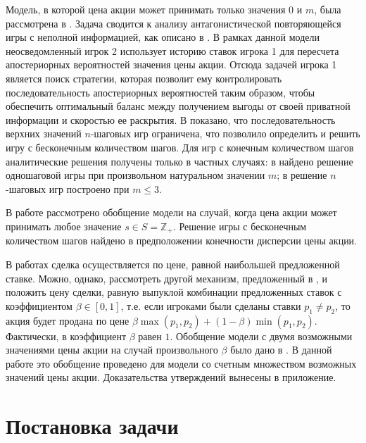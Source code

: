 \documentclass[12pt, draft]{extarticle}
\newcommand{\s}{\ensuremath{s}}
\begin{document}
Модель, в которой цена акции может принимать только значения $0$ и $m$, была
рассмотрена в \cite{bib:domansky07}. Задача сводится к анализу антагонистической
повторяющейся игры с неполной информацией, как описано в \cite{bib:aumann}. В
рамках данной модели неосведомленный игрок 2 использует историю ставок игрока 1
для пересчета апостериорных вероятностей значения цены акции. Отсюда задачей
игрока 1 является поиск стратегии, которая позволит ему контролировать
последовательность апостериорных вероятностей таким образом, чтобы обеспечить
оптимальный баланс между получением выгоды от своей приватной информации и
скоростью ее раскрытия. В \cite{bib:domansky07} показано, что последовательность
верхних значений $n$-шаговых игр ограничена, что позволило определить и решить
игру с бесконечным количеством шагов.
%
Для игр с конечным количеством шагов аналитические решения получены только в
частных случаях: в \cite{bib:sandomirskaya12} найдено решение одношаговой игры
при произвольном натуральном значении $m$; в \cite{bib:kreps09} решение
$n$-шаговых игр построено при $m \leqslant 3$.

В работе \cite{bib:domansky11} рассмотрено обобщение модели на случай, когда
цена акции может принимать любое значение $\s \in S = \mathbb{Z}_+$. Решение
игры с бесконечным количеством шагов найдено в предположении конечности
дисперсии цены акции.

В работах \cite{bib:domansky07, bib:domansky11} сделка осуществляется по цене,
равной наибольшей предложенной ставке. Можно, однако, рассмотреть другой
механизм, предложенный в \cite{bib:chatterjee83}, и положить цену сделки, равную
выпуклой комбинации предложенных ставок с коэффициентом $\beta \in [0,1]$, т.е.
если игроками были сделаны ставки $p_1 \neq p_2$, то акция будет продана по цене
$\beta \max(p_1, p_2) + (1-\beta) \min(p_1, p_2)$. Фактически, в
\cite{bib:domansky07, bib:domansky11} коэффициент $\beta$ равен $1$. Обобщение
модели с двумя возможными значениями цены акции на случай произвольного $\beta$
было дано в \cite{bib:pyanykh16}. В данной работе это обобщение проведено для
модели со счетным множеством возможных значений цены акции. Доказательства
утверждений вынесены в приложение.

\section{Постановка задачи}
\label{sec:problem-statement}
\end{document}
